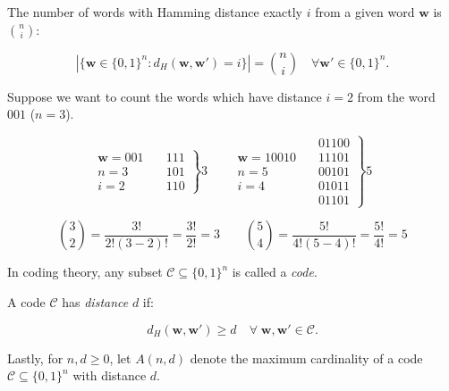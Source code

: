 \begin{proposition}
    The number of words with Hamming distance exactly $i$ from a given word $\mathbf{w}$ is ${ n \choose i }$:

    \begin{equation}
        |\{ \mathbf{w} \in \{0,1\}^n : d_H(\mathbf{w},\mathbf{w}') = i\}| = {n \choose i}\quad \forall \mathbf{w'} \in \{0,1\}^n.
    \end{equation}
\end{proposition}
\begin{example}
    Suppose we want to count the words which have distance $i=2$ from the word $001$ ($n=3$).
    
    \begin{equation}
        \begin{aligned}
            \mathbf{w} = 001 \\
            n = 3 \\
            i = 2 
        \end{aligned}
        \quad
        \left.\begin{aligned}
            111\\
            101\\
            110
        \end{aligned}
        \right\} 3
        \quad\quad
        \begin{aligned}
            \mathbf{w} = 10010 \\
            n = 5 \\
            i = 4
        \end{aligned}
        \quad
        \left.\begin{aligned}
            01100\\
            11101\\
            00101\\
            01011\\
            01101
        \end{aligned}
        \right\} 5
    \end{equation}

    \begin{equation}
        {3 \choose 2} = \frac{3!}{2!(3-2)!}=\frac{3!}{2!}=3
        \quad\quad
        {5 \choose 4} = \frac{5!}{4!(5-4)!}=\frac{5!}{4!}=5
    \end{equation}

\end{example}

\begin{definition}
In coding theory, any subset $\mathcal{C} \subseteq \{0,1\}^n$ is called a \emph{code}.

A code $\mathcal{C}$ has \emph{distance} $d$ if:

\begin{equation}
    d_H(\textbf{w}, \textbf{w}') \geq d \quad \forall \;\textbf{w}, \textbf{w}' \in \mathcal{C}.
\end{equation}

Lastly, for $n, d \geq 0$, let $A(n,d)$ denote the maximum cardinality of a code $\mathcal{C} \subseteq \{0,1\}^n$ with distance $d$.
\end{definition}

